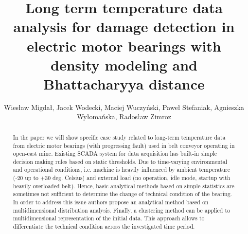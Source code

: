 \documentclass{svproc}
\begin{document}
\mainmatter              %
%
\title{Long term temperature data analysis for damage detection in electric motor bearings with density modeling and Bhattacharyya distance}
%
 \author{%
Wies{\l}aw Migda{\l}, Jacek Wodecki, Maciej Wuczy{\'n}ski, Pawe{\l} Stefaniak,  Agnieszka Wy{\l}oma{\'n}ska,  Rados{\l}aw Zimroz
}%
%
%
%



\maketitle              %

\begin{abstract}
In the paper we will show specific case study related to long-term temperature data from electric motor bearings (with progressing fault) used in belt conveyor operating in open-cast mine. Existing SCADA system for data acquisition has built-in simple decision making rules based on static thresholds. Due to time-varying environmental and operational conditions, i.e. machine is heavily influenced by ambient temperature (-20 up to +30 deg. Celsius) and external load (no operation, idle mode, startup with heavily overloaded belt). Hence, basic analytical methods based on simple statistics are sometimes not sufficient to determine the change of technical condition of the bearing. In order to address this issue authors propose an analytical method based on multidimensional distribution analysis. Finally, a clustering method can be applied to multidimensional representation of the initial data. This approach allows to differentiate the technical condition across the investigated time period.
\end{abstract}
\end{document}

